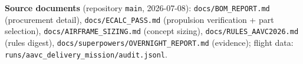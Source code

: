 \documentclass[11pt,a4paper]{article}
\begin{document}
\vspace{0.6em}
\noindent\textbf{Source documents} (repository \texttt{main}, 2026-07-08):
\texttt{docs/BOM\_REPORT.md} (procurement detail),
\texttt{docs/ECALC\_PASS.md} (propulsion verification + part selection),
\texttt{docs/AIRFRAME\_SIZING.md} (concept sizing),
\texttt{docs/RULES\_AAVC2026.md} (rules digest),
\texttt{docs/superpowers/OVERNIGHT\_REPORT.md} (evidence); flight data:
\texttt{runs/aavc\_delivery\_mission/audit.jsonl}.
\end{document}
